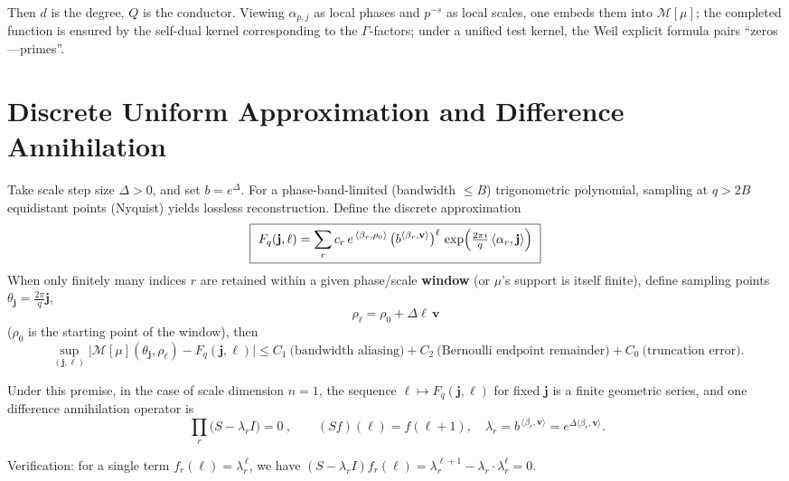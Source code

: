 \documentclass[11pt,a4paper]{article}
\theoremstyle{remark}
\begin{document}
Then $d$ is the degree, $Q$ is the conductor. Viewing $\alpha_{p,j}$ as local phases and $p^{-s}$ as local scales, one embeds them into $\mathcal{M}[\mu]$; the completed function is ensured by the self-dual kernel corresponding to the $\Gamma$-factors; under a unified test kernel, the Weil explicit formula pairs ``zeros---primes''.

\section{Discrete Uniform Approximation and Difference Annihilation}

Take scale step size $\Delta>0$, and set $b=e^{\Delta}$. For a phase-band-limited (bandwidth $\le B$) trigonometric polynomial, sampling at $q>2B$ equidistant points (Nyquist) yields lossless reconstruction. Define the discrete approximation
\begin{equation}
\boxed{\ F_q(\mathbf{j},\ell)=\sum_{r} c_r\,e^{\,\langle\beta_r,\rho_0\rangle}\,\big(b^{\langle\beta_r,\mathbf v\rangle}\big)^{\ell}\,
\exp\Bigl(\tfrac{2\pi i}{q}\,\langle\alpha_r,\mathbf{j}\rangle\Bigr)\ }
\end{equation}
When only finitely many indices $r$ are retained within a given phase/scale \textbf{window} (or $\mu$'s support is itself finite), define sampling points $\theta_{\mathbf{j}}=\frac{2\pi}{q}\mathbf{j}$,
\begin{equation}
\boxed{\ \rho_{\ell}=\rho_0+\Delta\ell\,\mathbf v\ }
\end{equation}
($\rho_0$ is the starting point of the window), then
\begin{equation}
\boxed{\ \sup_{(\mathbf{j},\ell)}\bigl|\mathcal{M}[\mu](\theta_{\mathbf{j}},\rho_{\ell})-F_q(\mathbf{j},\ell)\bigr|
\le C_1\ \text{(bandwidth aliasing)}+C_2\ \text{(Bernoulli endpoint remainder)}+C_0\ \text{(truncation error)} . }
\end{equation}

Under this premise, in the case of scale dimension $n=1$, the sequence $\ell\mapsto F_q(\mathbf{j},\ell)$ for fixed $\mathbf{j}$ is a finite geometric series, and one difference annihilation operator is
\begin{equation}
\boxed{\ \prod_{r}\bigl(S-\lambda_r I\bigr)=0\ },\qquad (Sf)(\ell)=f(\ell+1),\quad
\lambda_r=b^{\,\langle\beta_r,\mathbf v\rangle}=e^{\Delta\langle\beta_r,\mathbf v\rangle}.
\end{equation}

Verification: for a single term $f_r(\ell)=\lambda_r^{\,\ell}$, we have $(S-\lambda_r I)f_r(\ell)=\lambda_r^{\ell+1}-\lambda_r\cdot\lambda_r^{\ell}=0$.
\end{document}
